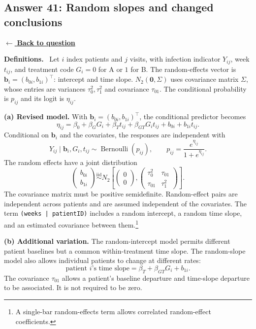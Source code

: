 \documentclass[11pt,a4paper]{article}
\newcommand{\given}{\mathrel{|}}
\newcommand{\answernav}[1]{%
  \label{answer:#1}%
  \noindent\hyperref[question:#1]{$\leftarrow$ \textbf{Back to question}}%
  \par\smallskip}
\newcommand{\studyheading}[1]{%
  \par\medskip\noindent\textcolor{statblue}{\textbf{#1.}}\ }
\begin{document}
\clearpage

\subsection{Answer 41: Random slopes and changed conclusions}
\answernav{41}

\studyheading{Definitions}
Let $i$ index patients and $j$ visits, with infection indicator $Y_{ij}$, week $t_{ij}$, and treatment code $G_i=0$ for A or $1$ for B.
The random-effects vector is $\mathbf b_i=(b_{0i},b_{1i})^\top$: intercept and time slope.
$N_2(\mathbf0,\Sigma)$ uses covariance matrix $\Sigma$, whose entries are variances $\tau_0^2,\tau_1^2$ and covariance $\tau_{01}$.
The conditional probability is $p_{ij}$ and its logit is $\eta_{ij}$.

\textbf{(a) Revised model.}
With $\mathbf b_i=(b_{0i},b_{1i})^\top$, the conditional predictor becomes
\[
\boxed{
\eta_{ij}
=\beta_0+\beta_GG_i+\beta_Tt_{ij}+\beta_{GT}G_it_{ij}
+b_{0i}+b_{1i}t_{ij}.
}
\]
Conditional on $\mathbf b_i$ and the covariates, the responses are
independent with
\[
Y_{ij}\given\mathbf b_i,G_i,t_{ij}
\sim\operatorname{Bernoulli}(p_{ij}),
\qquad p_{ij}=\frac{e^{\eta_{ij}}}{1+e^{\eta_{ij}}}.
\]
The random effects have a joint distribution
\[
\boxed{
\begin{pmatrix}b_{0i}\\b_{1i}\end{pmatrix}
\overset{\mathrm{iid}}{\sim}
N_2\!\left[
\begin{pmatrix}0\\0\end{pmatrix},
\begin{pmatrix}
\tau_0^2&\tau_{01}\\
\tau_{01}&\tau_1^2
\end{pmatrix}
\right].
}
\]
The covariance matrix must be positive semidefinite. Random-effect pairs
are independent across patients and are assumed independent of the
covariates. The term \texttt{(weeks | patientID)} includes a random
intercept, a random time slope, and an estimated covariance between
them.\footnote{A single-bar random-effects term
allows correlated random-effect coefficients.}

\textbf{(b) Additional variation.}
The random-intercept model permits different patient baselines but a
common within-treatment time slope. The random-slope model also allows
individual patients to change at different rates:
\[
\text{patient $i$'s time slope}
=\beta_T+\beta_{GT}G_i+b_{1i}.
\]
The covariance $\tau_{01}$ allows a patient's baseline departure and
time-slope departure to be associated. It is not required to be zero.
\end{document}
